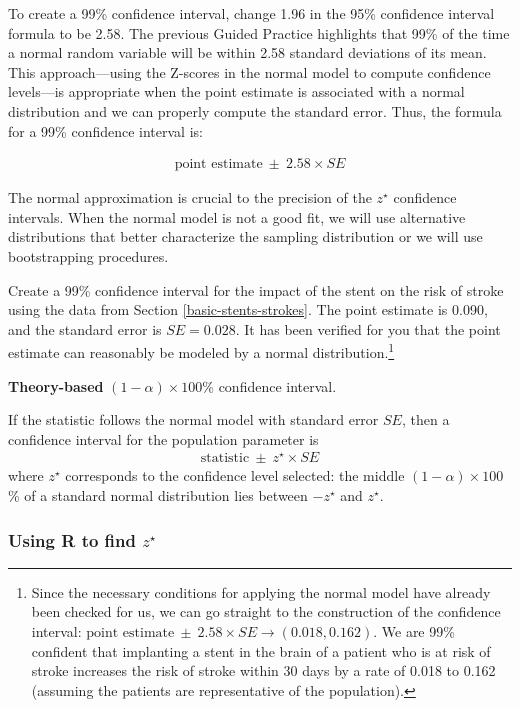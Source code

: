 \documentclass[
  10pt,
  openany]{book}
\theoremstyle{definition}
\theoremstyle{definition}
\theoremstyle{definition}
\theoremstyle{definition}
\theoremstyle{remark}
\begin{document}

To create a 99\% confidence interval, change 1.96 in the 95\% confidence interval formula to be 2.58. The previous Guided Practice highlights that 99\% of the time a normal random variable will be within 2.58 standard deviations of its mean. This approach---using the Z-scores in the normal model to compute confidence levels---is appropriate when the point estimate is associated with a normal distribution and we can properly compute the standard error. Thus, the formula for a 99\% confidence interval is:

\begin{eqnarray*}
\text{point estimate}\ \pm\ 2.58\times SE
\end{eqnarray*}

The normal approximation is crucial to the precision of the \(z^\star\) confidence intervals. When the normal model is not a good fit, we will use alternative distributions that better characterize the sampling distribution or we will use bootstrapping procedures.

Create a 99\% confidence interval for the impact of the stent on the risk of stroke using the data from Section \ref{basic-stents-strokes}. The point estimate is 0.090, and the standard error is \(SE = 0.028\). It has been verified for you that the point estimate can reasonably be modeled by a normal distribution.\footnote{Since the necessary conditions for applying the normal model have already been checked for us, we can go straight to the construction of the confidence interval: \(\text{point estimate}\ \pm\ 2.58 \times SE \rightarrow (0.018, 0.162)\). We are 99\% confident that implanting a stent in the brain of a patient who is at risk of stroke increases the risk of stroke within 30 days by a rate of 0.018 to 0.162 (assuming the patients are representative of the population).}

\textbf{Theory-based} \((1-\alpha)\times 100\)\% confidence interval.

If the statistic follows the normal model with standard error \(SE\), then a confidence interval for the population parameter is \begin{eqnarray*}
\text{statistic}\ \pm\ z^{\star} \times SE
\end{eqnarray*} where \(z^{\star}\) corresponds to the confidence level selected: the middle \((1-\alpha)\times 100\)\% of a standard normal distribution lies between \(-z^{\star}\) and \(z^{\star}\).

\subsubsection*{\texorpdfstring{Using R to find \(z^{\star}\)}{Using R to find z\^{}\{\textbackslash star\}}}\label{using-r-to-find-zstar}
\end{document}

